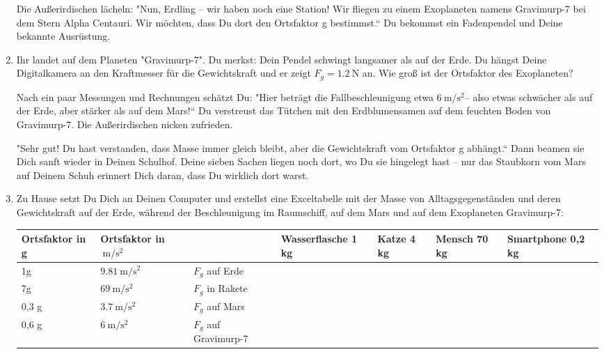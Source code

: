 \documentclass[a4paper]{article}
\begin{document}
\begin{enumerate}[1.]
Die Außerirdischen lächeln:
"Nun, Erdling – wir haben noch eine Station! Wir fliegen zu einem Exoplaneten namens Gravimurp-7 bei dem Stern Alpha Centauri. Wir möchten, dass Du dort den Ortsfaktor g bestimmst.“
Du bekommst ein Fadenpendel und Deine bekannte Ausrüstung.



\item Ihr landet auf dem Planeten "Gravimurp-7". Du merkst: Dein Pendel schwingt langsamer als auf der Erde. Du hängst Deine Digitalkamera an den Kraftmesser für die Gewichtskraft und er zeigt $F_g=\SI{1,2}{\newton}$ an.
Wie groß ist der Ortsfaktor des Exoplaneten?


Nach ein paar Messungen und Rechnungen schätzt Du:
"Hier beträgt die Fallbeschleunigung etwa $\SI{6}{\meter\per\second^2 }$– also etwas schwächer als auf der Erde, aber stärker als auf dem Mars!“
Du verstreust das Tütchen mit den Erdblumensamen auf dem feuchten Boden von Gravimurp-7.
Die Außerirdischen nicken zufrieden. 

"Sehr gut! Du hast verstanden, dass Masse immer gleich bleibt, aber die Gewichtskraft vom Ortsfaktor g abhängt.“
Dann beamen sie Dich sanft wieder in Deinen Schulhof.
Deine sieben Sachen liegen noch dort, wo Du sie hingelegt hast – nur das Staubkorn vom Mars auf Deinem Schuh erinnert Dich daran,
dass Du wirklich dort warst.

\item Zu Hause setzt Du Dich an Deinen Computer und erstellst eine Exceltabelle mit der Masse von Alltagsgegenständen  und deren Gewichtskraft auf der Erde,
während der Beschleunigung im Raumschiff, auf dem Mars und auf dem Exoplaneten Gravimurp-7:

\renewcommand{\arraystretch}{2}
\begin{tabular}{|p{}|p{}||p{3 cm}|p{2 cm}|p{2 cm}|p{2 cm}|p{2 cm}|}
	\hline
	  Ortsfaktor  in g & Ortsfaktor in  $\SI{}{\meter\per\second^2 }$& & Wasserflasche  1 kg & Katze 4 kg & Mensch 70 kg & Smartphone 0,2 kg \\
	\hline
	   1g & $\SI{9,81}{\meter\per\second^2 }$& $F_{g}$  auf Erde  & & & &\\
	\hline
	  7g & $\SI{69}{\meter\per\second^2 }$ &  $F_{g}$  in Rakete & & &  &\\
	\hline
		  0,3 g & $\SI{3,7}{\meter\per\second^2 }$& $F_{g}$  auf Mars & & & &\\
	 	\hline
	  0,6 g & $\SI{6}{\meter\per\second^2 }$ & $F_{g}$  auf Gravimurp-7	 & & & &\\
	\hline
	 
\end{tabular}
\end{enumerate} 
\end{document}
